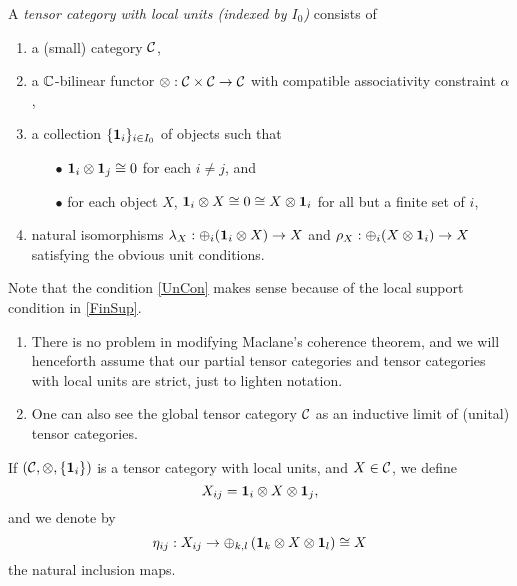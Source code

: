 \begin{Def} A \emph{tensor category with local units (indexed by $I_0$)} consists of
\begin{enumerate}[label=(\alph*)]
\item a (small) category $\mathcal{C}$, 
\item a $\mathbb{C}$-bilinear functor $\otimes: \mathcal{C}\times \mathcal{C} \rightarrow \mathcal{C}$ with compatible associativity constraint $\alpha$, 
\item\label{FinSup} a collection $\{\mathbf{1}_i\}_{i\in I_0}$ of objects such that 
\begin{itemize}\item[$\bullet$] $\mathbf{1}_i\otimes \mathbf{1}_j \cong 0$ for each $i\neq j$, and
\item[$\bullet$] for each object $X$,  $\mathbf{1}_i\otimes X \cong 0 \cong X\otimes \mathbf{1}_i$ for all but a finite set of $i$,
\end{itemize}
\item\label{UnCon} natural isomorphisms $\lambda_X:\oplus_i (\mathbf{1}_i\otimes X) \rightarrow X$ and $\rho_X:\oplus_i(X\otimes \mathbf{1}_i)\rightarrow X$ satisfying the obvious unit conditions. 
\end{enumerate} 
\end{Def}


Note that the condition \ref{UnCon} makes sense because of the local support condition in \ref{FinSup}. 

\begin{Rem} \begin{enumerate}
\item There is no problem in modifying Maclane's coherence theorem, and we will henceforth assume that our partial tensor categories and tensor categories with local units are strict, just to lighten notation. 
\item One can also see the global tensor category $\mathcal{C}$ as an inductive limit of (unital) tensor categories. 
\end{enumerate}
\end{Rem}

\begin{Not} If $(\mathcal{C},\otimes,\{\mathbf{1}_i\})$ is a tensor category with local units, and $X\in \mathcal{C}$, we define \[X_{ij} = \mathbf{1}_i\otimes X \otimes \mathbf{1}_j,\] and we denote by \[\eta_{ij}:X_{ij} \rightarrow \oplus_{k,l} \left(\mathbf{1}_k \otimes X \otimes \mathbf{1}_l\right) \cong X\] the natural inclusion maps. %
\end{Not}


